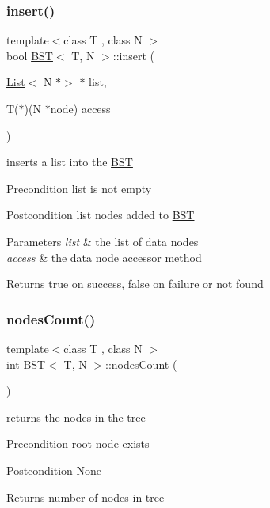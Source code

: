 \subsubsection{\texorpdfstring{insert()}{insert()}}
{\footnotesize\ttfamily template$<$class T , class N $>$ \\
bool \hyperlink{class_b_s_t}{B\+ST}$<$ T, N $>$\+::insert (\begin{DoxyParamCaption}\item[{\hyperlink{class_list}{List}$<$ N $\ast$$>$ $\ast$}]{list,  }\item[{T($\ast$)(N $\ast$node)}]{access }\end{DoxyParamCaption})}

inserts a list into the \hyperlink{class_b_s_t}{B\+ST} \begin{DoxyPrecond}{Precondition}
list is not empty 
\end{DoxyPrecond}
\begin{DoxyPostcond}{Postcondition}
list nodes added to \hyperlink{class_b_s_t}{B\+ST} 
\end{DoxyPostcond}

\begin{DoxyParams}{Parameters}
{\em list} & the list of data nodes \\
\hline
{\em access} & the data node accessor method \\
\hline
\end{DoxyParams}
\begin{DoxyReturn}{Returns}
true on success, false on failure or not found 
\end{DoxyReturn}
\mbox{\label{class_b_s_t_a86fb81e20a21ef65e2b57e55d910d875}} 
\subsubsection{\texorpdfstring{nodes\+Count()}{nodesCount()}}
{\footnotesize\ttfamily template$<$class T , class N $>$ \\
int \hyperlink{class_b_s_t}{B\+ST}$<$ T, N $>$\+::nodes\+Count (\begin{DoxyParamCaption}{ }\end{DoxyParamCaption})}

returns the nodes in the tree \begin{DoxyPrecond}{Precondition}
root node exists 
\end{DoxyPrecond}
\begin{DoxyPostcond}{Postcondition}
None 
\end{DoxyPostcond}
\begin{DoxyReturn}{Returns}
number of nodes in tree 
\end{DoxyReturn}
\mbox{\label{class_b_s_t_abd50732adeb88dbb562a640d06a0c25f}} 
